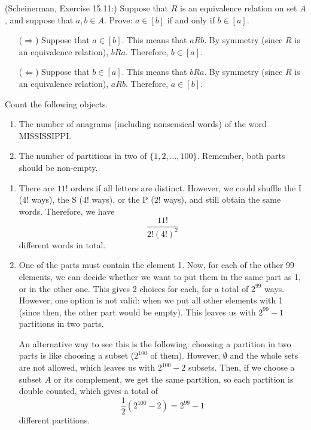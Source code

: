 \documentclass{article}
\theoremstyle{definition}
\begin{document}
\begin{question}
    (Scheinerman, Exercise 15.11:)
    Suppose that $R$ is an equivalence relation on  set $A$, and suppose that $a, b \in A$.
    Prove: $a \in [b]$ if and only if $b \in [a]$.
\end{question}
\begin{solution}
    \begin{itemize}
    \item[($\Rightarrow$)] Suppose that $a \in [b]$.  This means that $a R b$.  By symmetry (since $R$ is an equivalence relation), $b R a$.  Therefore, $b \in [a]$.
    \item[($\Leftarrow$)] Suppose that $b \in [a]$.  This means that $b R a$.  By symmetry (since $R$ is an equivalence relation), $a R b$.  Therefore, $a \in [b]$.
    \end{itemize}
\end{solution}


\begin{question}
    Count the following objects.
    	\begin{enumerate}
    	\item The number of anagrams (including nonsensical words) of the word MISSISSIPPI.
   	 \item The number of partitions in two of $\{1, 2, \dots, 100 \}$. Remember, both parts should be non-empty.
   	\end{enumerate}
\end{question}
\begin{solution}
    	\begin{enumerate}
    	\item There are $11!$ orders if all letters are distinct. However, we could shuffle the I ($4!$ ways), the S ($4!$ ways), or the P ($2!$ ways), and still obtain the same words. Therefore, we have
	\[
	\frac{11!}{2! (4!)^2}
	\]
	different words in total.
   	 \item One of the parts must contain the element 1. Now, for each of the other 99 elements, we can decide whether we want to put them in the same part as 1, or in the other one. This gives 2 choices for each, for a total of $2^{99}$ ways. However, one option is not valid: when we put all other elements with 1 (since then, the other part would be empty). This leaves us with $2^{99} - 1$ partitions in two parts.
	
	An alternative way to see this is the following: choosing a partition in two parts is like choosing a subset ($2^{100}$ of them). However, $\emptyset$ and the whole sets are not allowed, which leaves us with $2^{100} - 2$ subsets. Then, if we choose a subset $A$ or its complement, we get the same partition, so each partition is double counted, which gives a total of
	\[
	\frac12 \left ( 2^{100} - 2 \right ) = 2^{99} - 1
	\]
	different partitions.
   	\end{enumerate}
\end{solution}
\end{document}
